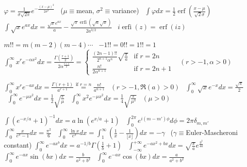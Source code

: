 {$\varphi{=}\frac{1}{\sigma\sqrt{2\pi}}e^{-\frac{(x-\mu)^2}{2\sigma^2}}$ \ ($\mu{\equiv}$mean, $\sigma^2{\equiv}$variance) \
$\int\!\varphi dx{=}\frac{1}{2}\operatorname{erf}\left(\frac{x{-}\mu}{\sqrt{2}\sigma}\right)$ \
$\int\!\sqrt{x}e^{ax}dx{=}\frac{\sqrt{x}e^{ax}}{a}{-}\frac{\sqrt{\pi}\operatorname{erfi}(\sqrt{a}\sqrt{x})}{2a^{3/2}}$ \ $i\operatorname{erfi}(z){=}\operatorname{erf}(iz)$

$m!!{=}m(m{-}2)(m{-}4)\cdots$ \ ${-}1!!{=}0!!{=}1!!{=}1$ \
$\int_0^\infty\!x^re^{-\alpha x^2}dx{=}\frac{\Gamma\left(\frac{r+1}{2}\right)}{2\alpha^{\frac{r+1}{2}}}{=}\begin{cases}
\frac{(2n{-}1)!!}{2^{n+1}\alpha^n}\sqrt{\frac{\pi}{a}} & \text{if }r{=}2n \\
\frac{n!}{2\alpha^{n+1}} & \text{if }r{=}2n{+}1
\end{cases}$ \ {\scriptsize$(r{>}{-}1,\alpha{>}0)$}

$\int_0^\infty\!x^re^{-ax}dx{=}\frac{\Gamma(r{+}1)}{a^{r+1}}\stackrel{\text{if }r{=}n}{=}\frac{n!}{a^{n+1}}$ \ {\scriptsize$(r{>}{-}1,\Re(a){>}0)$} \
$\int_0^\infty\!\sqrt{x}e^{-x}dx{=}\frac{\sqrt{\pi}}{2}$ \
$\int_0^\infty\!e^{-\mu x^2}dx{=}\frac{1}{2}\sqrt{\frac{\pi}{\mu}}$ \
$\int_0^\infty\!x^2e^{-\mu x^2}dx{=}\frac{1}{4}\sqrt{\frac{\pi}{\mu^3}}$ \ {\scriptsize$(\mu{>}0)$}

$\int\!(e^{-x/a}{+}1)^{-1}dx{=}a\ln(e^{x/a}{+}1)$ \
$\int_0^{2\pi}\!e^{i(m-m')\phi}d\phi{=}2\pi\delta_{m,m'}$ \
$\int_0^\infty\!\frac{x}{e^x{-}1}dx{=}\frac{\pi^2}{6}$ \
$\int_0^\infty\!\frac{\ln x}{e^x}dx{=}\int_1^\infty\!\left(\frac{1}{x}{-}\frac{1}{\lfloor x\rfloor}\right)dx{=}{-}\gamma$ \ ($\gamma{\equiv}$Euler-Mascheroni constant)
$\int_0^\infty\!e^{-ax^b}dx{=}a^{-1/b}\Gamma\left(\frac{1}{b}{+}1\right)$ \ $\int_{-\infty}^{+\infty}\!e^{-ax^2{+}bx}dx{=}\sqrt{\frac{\pi}{a}}e^{\frac{b^2}{4a}}$\\
$\int_0^\infty\!e^{-ax}\sin(bx)dx{=}\frac{b}{a^2{+}b^2}$ \
$\int_0^\infty\!e^{-ax}\cos(bx)dx{=}\frac{a}{a^2{+}b^2}$ 
}